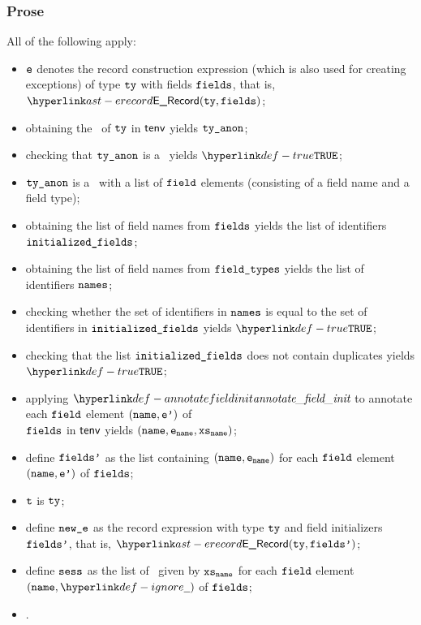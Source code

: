\subsubsection{Prose}
All of the following apply:
\begin{itemize}
  \item $\texttt{e}$ denotes the record construction expression (which is also used for creating exceptions) of type $\texttt{ty}$ with fields $\texttt{fields}$,
        that is, $\ERecord(\tty, \vfields)$;
  \item obtaining the \underlyingtype\ of $\texttt{ty}$ in $\textsf{tenv}$ yields $\texttt{ty\_anon}$\ProseOrTypeError;
  \item checking that $\texttt{ty\_anon}$ is a \structuredtype\ yields $\True$\ProseOrTypeError;%
  \item $\texttt{ty\_anon}$ is a \structuredtype\ with a list of $\texttt{field}$ elements (consisting of a field name and a field type);
  \item obtaining the list of field names from $\texttt{fields}$ yields the list of identifiers \\
        $\texttt{initialized\_fields}$;
  \item obtaining the list of field names from $\texttt{field\_types}$ yields the list of identifiers $\texttt{names}$;
  \item checking whether the set of identifiers in $\texttt{names}$ is equal to the set of identifiers in $\texttt{initialized\_fields}$
        yields $\True$\ProseOrTypeError;
  \item checking that the list $\texttt{initialized\_fields}$ does not contain duplicates yields \\
        $\True$\ProseOrTypeError;
  \item applying $\annotatefieldinit$ to annotate each $\texttt{field}$ element $(\texttt{name},\texttt{e'})$ of \\
        $\texttt{fields}$ in $\textsf{tenv}$ yields $(\texttt{name},\texttt{e}_{\texttt{name}},\texttt{xs}_{\texttt{name}})$\ProseOrTypeError;
  \item define $\texttt{fields'}$ as the list containing $(\texttt{name},\texttt{e}_{\texttt{name}})$ for each $\texttt{field}$ element $(\texttt{name},\texttt{e'})$ of $\texttt{fields}$;
  \item $\texttt{t}$ is $\texttt{ty}$;
  \item define $\texttt{new\_e}$ as the record expression with type $\texttt{ty}$ and field initializers $\texttt{fields'}$, that is, $\ERecord(\tty, \fieldsp)$;
  \item define $\vsess$ as the list of \sideeffectdescriptorsetsterm\ given by $\texttt{xs}_{\texttt{name}}$ for each $\texttt{field}$ element $(\name,\Ignore)$ of $\texttt{fields}$;
  \item \Prosenonconflictingunion{$\vsess$}{$\vses$}.
\end{itemize}
